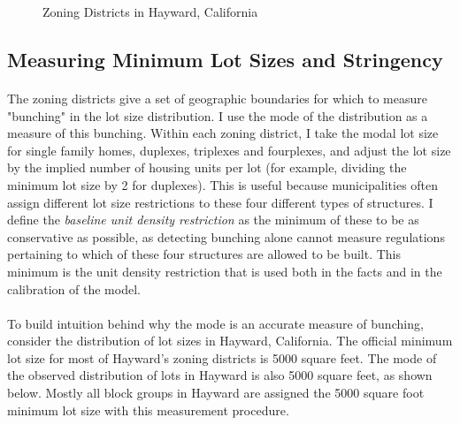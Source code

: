 \documentclass[12pt]{article}
\begin{document}
	\begin{figure}[htbp!]
	\caption{Zoning Districts in Hayward, California}\label{figure:ZoningDistricts}
	
	\end{figure}
 	
 	
 	\clearpage
	\subsection{Measuring Minimum Lot Sizes and Stringency}\label{Appendix:MeasureStringency}
	
	\paragraph*{}
	The zoning districts give a set of geographic boundaries for which to measure "bunching" in the lot size distribution. I use the mode of the distribution as a measure of this bunching. Within each zoning district, I take the modal lot size for single family homes, duplexes, triplexes and fourplexes, and adjust the lot size by the implied number of housing units per lot (for example, dividing the minimum lot size by 2 for duplexes). This is useful because municipalities often assign different lot size restrictions to these four different types of structures. I define the \textit{baseline unit density restriction} as the minimum of these to be as conservative as possible, as detecting bunching alone cannot measure regulations pertaining to which of these four structures are allowed to be built. This minimum is the unit density restriction that is used both in the facts and in the calibration of the model. 
	
	\paragraph*{}
	To build intuition behind why the mode is an accurate measure of bunching, consider the distribution of lot sizes in Hayward, California. The official minimum lot size for most of Hayward's zoning districts is 5000 square feet. The mode of the observed distribution of lots in Hayward is also 5000 square feet, as shown below. Mostly all block groups in Hayward are assigned the 5000 square foot minimum lot size with this measurement procedure. 
	
\end{document}
